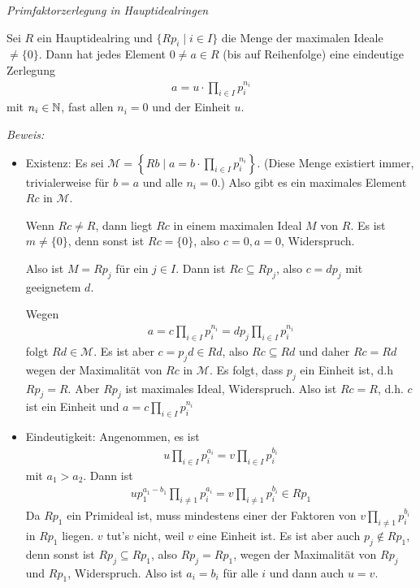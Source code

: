 \begin{mysatz} \textit{Primfaktorzerlegung in Hauptidealringen} \label{pfz-in-hir}

    Sei $R$ ein Hauptidealring und $\{Rp_i \mid i \in I\}$ die Menge der maximalen Ideale $\neq \{ 0 \}$.
    Dann hat jedes Element $0 \neq a \in R$ (bis auf Reihenfolge) eine eindeutige Zerlegung
    \begin{align*}
        a = u \cdot \prod_{i \in I} p_i^{n_i}
    \end{align*}
    mit $n_i \in \mathbb{N}$, fast allen $n_i = 0$ und der Einheit $u$.

    \textit{Beweis:}
    \begin{itemize}
        \item Existenz: Es sei $\mathcal{M} = \left\{Rb \mid a = b \cdot \prod\limits_{i \in I}p_i^{n_i}\right\}$. (Diese Menge existiert immer, trivialerweise für $b = a$ und alle $n_i = 0$.)
            Also gibt es ein maximales Element $Rc$ in $\mathcal{M}$.

            Wenn $Rc \neq R$, dann liegt $Rc$ in einem maximalen Ideal $M$ von $R$. Es ist $m \neq \{ 0 \}$, denn sonst ist $Rc = \{ 0 \}$, also $c = 0, a = 0$, Widerspruch.

            Also ist $M = Rp_j$ für ein $j \in I$. Dann ist $Rc \subseteq Rp_j$, also $c = dp_j$ mit geeignetem $d$.

            Wegen
            \begin{align*}
                a = c \prod\limits_{i\in I}p_i^{n_i} = dp_j\prod\limits_{i \in I}p_i^{n_i}
            \end{align*}
            folgt $Rd\in \mathcal{M}$. Es ist aber $c=p_jd\in Rd$, also $Rc \subseteq Rd$ und daher $Rc=Rd$ wegen der Maximalität von $Rc$ in $\mathcal{M}$. Es 
            folgt, dass $p_j$ ein Einheit ist, d.h $Rp_j=R$. Aber $Rp_j$ ist maximales Ideal, Widerspruch.
            Also ist $Rc=R$, d.h. $c$ ist ein Einheit und $a=c\prod_{i\in I}p_i^{n_i}$\par \medskip
        \item Eindeutigkeit: Angenommen, es ist
            \begin{align*}
                u \prod\limits_{i \in I}p_i^{a_i} = v \prod\limits_{i \in I}p_i^{b_i}
            \end{align*}
            mit $a_1 > a_2$. Dann ist
            \begin{align*}
                u p_1^{a_1 - b_1} \prod\limits_{i \neq 1}p_i^{a_i}= v \prod_{i \neq 1}p_i^{b_i} \in Rp_1
            \end{align*}
            Da $Rp_1$ ein Primideal ist, muss mindestens einer der Faktoren von $v \prod\limits_{i \neq 1}p_i^{b_i}$ in $Rp_1$ liegen. $v$ tut's nicht, weil $v$ eine Einheit ist. 
            Es ist aber auch $p_j \notin Rp_1$, denn sonst ist $Rp_j \subseteq Rp_1$, also $Rp_j = Rp_1$, wegen der Maximalität von $Rp_j$ und $Rp_1$, Widerspruch.
            Also ist $a_i = b_i$ für alle $i$ und dann auch $u = v$.
    \end{itemize}
\end{mysatz}

